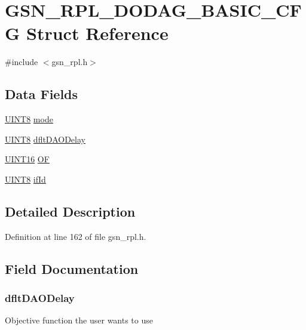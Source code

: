 \hypertarget{a00198}{
\section{GSN\_\-RPL\_\-DODAG\_\-BASIC\_\-CFG Struct Reference}
\label{a00198}
}


{\ttfamily \#include $<$gsn\_\-rpl.h$>$}

\subsection*{Data Fields}
\begin{DoxyCompactItemize}
\item 
\hyperlink{a00660_gab27e9918b538ce9d8ca692479b375b6a}{UINT8} \hyperlink{a00198_a7d61d79fa98a45545166420dec0d8f3d}{mode}
\item 
\hyperlink{a00660_gab27e9918b538ce9d8ca692479b375b6a}{UINT8} \hyperlink{a00198_a395ecd47d8bd866308f80b24300fd2f9}{dfltDAODelay}
\item 
\hyperlink{a00660_ga09f1a1fb2293e33483cc8d44aefb1eb1}{UINT16} \hyperlink{a00198_ad68e16daaf3b5aff7cac17e6c2ef5e03}{OF}
\item 
\hyperlink{a00660_gab27e9918b538ce9d8ca692479b375b6a}{UINT8} \hyperlink{a00198_a0f9aaec90ed26330a798d110bc4bc237}{ifId}
\end{DoxyCompactItemize}


\subsection{Detailed Description}


Definition at line 162 of file gsn\_\-rpl.h.



\subsection{Field Documentation}
\hypertarget{a00198_a395ecd47d8bd866308f80b24300fd2f9}{
\subsubsection[{dfltDAODelay}]{ {\bf dfltDAODelay}}}
\label{a00198_a395ecd47d8bd866308f80b24300fd2f9}
Objective function the user wants to use 

